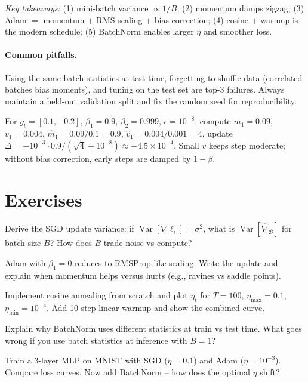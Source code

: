 \smallskip
\noindent\textit{Key takeaways:} (1) mini-batch variance $\propto1/B$;
(2) momentum damps zigzag; (3) Adam $=$ momentum $+$ RMS scaling $+$ bias
correction; (4) cosine + warmup is the modern schedule; (5) BatchNorm enables
larger $\eta$ and smoother loss.

\paragraph{Common pitfalls.} Using the same batch statistics at test time, forgetting to shuffle data (correlated batches bias moments), and tuning on the test set are top-3 failures. Always maintain a held-out validation split and fix the random seed for reproducibility.

\begin{example} For $g_t=[0.1, -0.2]$, $\beta_1=0.9$, $\beta_2=0.999$, $\epsilon=10^{-8}$, compute $m_1=0.09$, $v_1=0.004$, $\hat m_1=0.09/0.1=0.9$, $\hat v_1=0.004/0.001=4$, update $\Delta=-10^{-3}\cdot0.9/(\sqrt4+10^{-8})\approx-4.5\times10^{-4}$. Small $v$ keeps step moderate; without bias correction, early steps are damped by $1-\beta$.
\end{example}

\section{Exercises}
\begin{exercise} Derive the SGD update variance: if $\operatorname{Var}[\nabla\ell_i]=\sigma^2$, what is $\operatorname{Var}[\hat\nabla_{\mathcal{B}}]$ for batch size $B$? How does $B$ trade noise vs compute?\end{exercise}
\begin{exercise} Adam with $\beta_1=0$ reduces to RMSProp-like scaling. Write the update and explain when momentum helps versus hurts (e.g., ravines vs saddle points).\end{exercise}
\begin{exercise} Implement cosine annealing from scratch and plot $\eta_t$ for $T=100$, $\eta_{\max}=0.1$, $\eta_{\min}=10^{-4}$. Add 10-step linear warmup and show the combined curve.\end{exercise}
\begin{exercise} Explain why BatchNorm uses different statistics at train vs test time. What goes wrong if you use batch statistics at inference with $B=1$?\end{exercise}
\begin{exercise} Train a 3-layer MLP on MNIST with SGD ($\eta=0.1$) and Adam ($\eta=10^{-3}$). Compare loss curves. Now add BatchNorm -- how does the optimal $\eta$ shift?\end{exercise}
